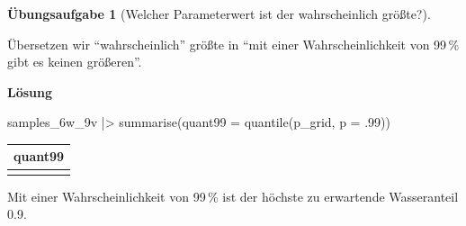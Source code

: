 \documentclass[
  ngerman,
  letterpaper,
  twoside,
  open=any]{scrbook}
\newenvironment{Shaded}{\begin{snugshade}}{\end{snugshade}}
\newcommand{\AttributeTok}[1]{\textcolor[rgb]{0.40,0.45,0.13}{#1}}
\newcommand{\DecValTok}[1]{\textcolor[rgb]{0.68,0.00,0.00}{#1}}
\newcommand{\FunctionTok}[1]{\textcolor[rgb]{0.28,0.35,0.67}{#1}}
\newcommand{\NormalTok}[1]{\textcolor[rgb]{0.00,0.23,0.31}{#1}}
\newcommand{\SpecialCharTok}[1]{\textcolor[rgb]{0.37,0.37,0.37}{#1}}
\newcounter{none} %
\theoremstyle{definition}
\theoremstyle{plain}
\theoremstyle{definition}
\newtheorem{exercise}{Übungsaufgabe}[chapter]
\theoremstyle{definition}
\theoremstyle{definition}
\theoremstyle{definition}
\newtheorem{exercise}{Übungsaufgabe}[chapter]
\theoremstyle{remark}
\begin{document}
\begin{exercise}[Welcher Parameterwert ist der wahrscheinlich
größte?]\protect\hypertarget{exr-quant1}{}\label{exr-quant1}

Übersetzen wir \enquote{wahrscheinlich} größte in \enquote{mit einer
Wahrscheinlichkeit von 99\,\% gibt es keinen größeren}.

\begin{tcolorbox}[enhanced jigsaw, arc=.35mm, bottomrule=.15mm, breakable, colback=white, colframe=quarto-callout-tip-color-frame, left=2mm, leftrule=.75mm, opacityback=0, rightrule=.15mm, toprule=.15mm]

\vspace{-3mm}\textbf{Lösung}\vspace{3mm}

\begin{Shaded}
\begin{Highlighting}[]
\NormalTok{samples\_6w\_9v }\SpecialCharTok{|\textgreater{}} 
  \FunctionTok{summarise}\NormalTok{(}\AttributeTok{quant99 =} \FunctionTok{quantile}\NormalTok{(p\_grid, }\AttributeTok{p =}\NormalTok{ .}\DecValTok{99}\NormalTok{))}
\end{Highlighting}
\end{Shaded}

{\def\LTcaptype{none} %
\begin{longtable}[]{@{}r@{}}
\toprule\noalign{}
quant99 \\
\midrule\noalign{}
\endhead
\bottomrule\noalign{}
\endlastfoot
0.9 \\
\end{longtable}
}

Mit einer Wahrscheinlichkeit von 99\,\% ist der höchste zu erwartende
Wasseranteil 0.9.

\end{tcolorbox}

\end{exercise}
\end{document}
